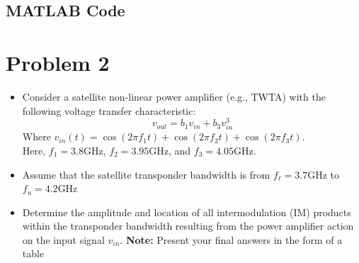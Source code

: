 \documentclass[titlepage]{article}
\begin{document}
\newpage

\subsection{MATLAB Code}

\newpage
\section {Problem 2}

\begin{tcolorbox}
    \begin{itemize}
        \item Consider a satellite non-linear power amplifier (e.g., TWTA) with the
              following voltage transfer characteristic:
              $$v_{out} = b_1v_{in}+b_3v_{in}^3$$
              Where $v_{in}(t) = \cos(2\pi f_1t)+\cos(2\pi f_2t)+\cos(2\pi f_3t)$. \\[1ex]
              Here, $f_1 = 3.8$GHz, $f_2 = 3.95$GHz, and $f_3 = 4.05$GHz.
        \item Assume that the satellite transponder bandwidth is from $f_{\ell} = 3.7$GHz to $f_u = 4.2$GHz
        \item Determine the amplitude and location of all intermodulation (IM) products within the transponder bandwidth resulting from the power amplifier action on the input signal $v_{in}$. \textbf{Note: }Present your final answers in the form of a table
    \end{itemize}

\end{tcolorbox}
\end{document}
